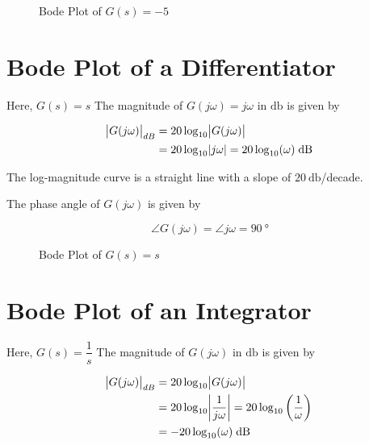 \documentclass[
  14pt,
  a4paper,
  oneside,
  open=any,
  a4paper,
  14pt]{report}
\begin{document}
\begin{figure}

\centering{



}

\caption{\label{fig-bode-plot-constant-2}Bode Plot of \(G(s) = -5\)}

\end{figure}%

\newpage{}

\section{Bode Plot of a
Differentiator}\label{bode-plot-of-a-differentiator}

Here, \(G(s) = s\) The magnitude of \(G(j\omega) = j\omega\) in
\(\unit{\decibel}\) is given by

\[
\begin{aligned}
    \abs{G(j\omega)}_{dB} &= 20\log_{10}\abs{G(j\omega)} \\
    &= 20\log_{10}\abs{j\omega} = 20\log_{10}(\omega) \; \unit{\decibel}
\end{aligned}
\]

The log-magnitude curve is a straight line with a slope of
\(\SI{20}{\decibel}\)/decade.

The phase angle of \(G(j\omega)\) is given by

\[
    \angle G(j\omega) = \angle j\omega = \SI{90}{\degree}
\]

\begin{figure}

\centering{



}

\caption{\label{fig-bode-plot-differentiator}Bode Plot of \(G(s) = s\)}

\end{figure}%

\newpage{}

\section{Bode Plot of an Integrator}\label{bode-plot-of-an-integrator}

Here, \(G(s) = \dfrac{1}{s}\) The magnitude of \(G(j\omega)\) in
\(\unit{\decibel}\) is given by

\[
\begin{aligned}
    \abs{G(j\omega)}_{dB} &= 20\log_{10}\abs{G(j\omega)} \\
    &= 20\log_{10}\abs{\dfrac{1}{j\omega}} = 20\log_{10}\left(\dfrac{1}{\omega}\right) \\
    &= -20\log_{10}(\omega) \; \unit{\decibel}
\end{aligned}
\]
\end{document}
